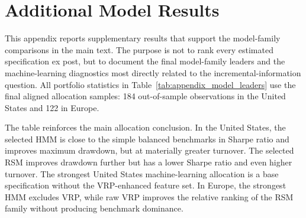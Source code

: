 \section{Additional Model Results}
\label{app:model-results}

This appendix reports supplementary results that support the model-family comparisons in the main text. The purpose is not to rank every estimated specification ex post, but to document the final model-family leaders and the machine-learning diagnostics most directly related to the incremental-information question. All portfolio statistics in Table~\ref{tab:appendix_model_leaders} use the final aligned allocation samples: 184 out-of-sample observations in the United States and 122 in Europe.

\begin{table}[H]
\centering
\caption{Final allocation model-family leaders}
\label{tab:appendix_model_leaders}
\small
{}
\end{table}

The table reinforces the main allocation conclusion. In the United States, the selected HMM is close to the simple balanced benchmarks in Sharpe ratio and improves maximum drawdown, but at materially greater turnover. The selected RSM improves drawdown further but has a lower Sharpe ratio and even higher turnover. The strongest United States machine-learning allocation is a base specification without the VRP-enhanced feature set. In Europe, the strongest HMM excludes VRP, while raw VRP improves the relative ranking of the RSM family without producing benchmark dominance.

